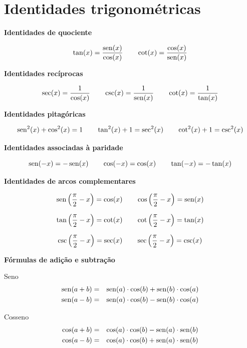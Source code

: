  \newpage

 \section{Identidades trigonométricas}

 \textbf{Identidades de quociente}

\begin{equation}
\tan(x)= \dfrac{\operatorname{sen}(x)}{\cos(x)} \qquad \operatorname{cot}(x)= \dfrac{\cos(x)}{\operatorname{sen}(x)}
\end{equation}

 \vskip0.5cm
 \textbf{Identidades recíprocas}

 \[\sec(x)= \dfrac{1}{\cos(x)} \qquad
   \csc(x)= \dfrac{1}{\operatorname{sen}(x)} \qquad
   \operatorname{cot}(x)= \dfrac{1}{\tan(x)}\]

 \vskip0.5cm
 \textbf{Identidades pitagóricas}

 \[\operatorname{sen}^2(x) + \cos^2(x)= 1 \qquad
   \tan^2(x)+ 1= \sec^2(x) \qquad
   \operatorname{cot}^2(x)+1=\operatorname{csc}^2(x)\]

 \vskip0.5cm
 \textbf{Identidades associadas à paridade}

\begin{equation}
\operatorname{sen}(-x)= -\operatorname{sen}(x) \qquad \cos(-x)= \cos(x) \qquad \tan(-x)=-\tan(x)
\end{equation}

 \vskip0.5cm
 \textbf{Identidades de arcos complementares}

 \[\operatorname{sen} \left(\frac{\pi}{2} - x \right)= \cos(x) \qquad
   \cos \left(\frac{\pi}{2} - x \right)= \operatorname{sen}(x)\]

 \[\tan \left(\frac{\pi}{2} - x \right)= \operatorname{cot}(x) \qquad
   \operatorname{cot} \left(\frac{\pi}{2} - x \right)= \tan(x)\]

 \[\operatorname{csc} \left(\frac{\pi}{2} - x \right)= \sec(x) \qquad
   \sec \left(\frac{\pi}{2} - x \right)= \operatorname{csc}(x)\]


\vskip0.5cm
 \textbf{Fórmulas de adição e subtração}

 Seno
 \begin{eqnarray*}
  \operatorname{sen}(a+b)&=&\operatorname{sen}(a)\cdot \cos(b)+\operatorname{sen}(b)\cdot \cos(a) \\
  \operatorname{sen}(a-b)&=&\operatorname{sen}(a)\cdot \cos(b)-\operatorname{sen}(b)\cdot \cos(a)
 \end{eqnarray*}

 Cosseno
 \begin{eqnarray*}
  \cos(a+b)&=&\cos(a)\cdot \cos(b)-\operatorname{sen}(a)\cdot \operatorname{sen}(b) \\
  \cos(a-b)&=&\cos(a)\cdot \cos(b)+\operatorname{sen}(a)\cdot \operatorname{sen}(b)
 \end{eqnarray*}


